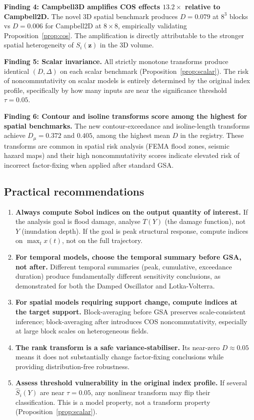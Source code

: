 \documentclass[11pt,onecolumn]{article}
\begin{document}
\textbf{Finding 4: Campbell3D amplifies COS effects $13.2\times$ relative to
Campbell2D.}
The novel 3D spatial benchmark produces $D = 0.079$ at $8^3$ blocks vs
$D = 0.006$ for Campbell2D at $8\times8$, empirically validating
Proposition~\ref{prop:cos}.  The amplification is directly attributable to
the stronger spatial heterogeneity of $S_i(\mathbf{z})$ in the 3D volume.

\textbf{Finding 5: Scalar invariance.}
All strictly monotone transforms produce identical $(D, \Delta)$ on each scalar
benchmark (Proposition~\ref{prop:scalar}).  The risk of noncommutativity on scalar
models is entirely determined by the original index profile, specifically by how
many inputs are near the significance threshold $\tau = 0.05$.

\textbf{Finding 6: Contour and isoline transforms score among the highest for
spatial benchmarks.}
The new contour-exceedance and isoline-length transforms achieve
$D_\mu = 0.372$ and $0.405$, among the highest mean $D$ in the registry.
These transforms are common in spatial risk analysis (FEMA flood zones,
seismic hazard maps) and their high noncommutativity scores indicate elevated
risk of incorrect factor-fixing when applied after standard GSA.

\subsection{Practical recommendations}
\label{sec:recommendations}

\begin{enumerate}
  \item \textbf{Always compute Sobol indices on the output quantity of interest.}
    If the analysis goal is flood damage, analyse $T(Y)$ (the damage function),
    not $Y$ (inundation depth). If the goal is peak structural response, compute
    indices on $\max_t x(t)$, not on the full trajectory.
  \item \textbf{For temporal models, choose the temporal summary before GSA, not after.}
    Different temporal summaries (peak, cumulative, exceedance duration) produce
    fundamentally different sensitivity conclusions, as demonstrated for both
    the Damped Oscillator and Lotka-Volterra.
  \item \textbf{For spatial models requiring support change, compute indices at
    the target support.}  Block-averaging before GSA preserves scale-consistent
    inference; block-averaging after introduces COS noncommutativity, especially
    at large block scales on heterogeneous fields.
  \item \textbf{The rank transform is a safe variance-stabiliser.}
    Its near-zero $D \approx 0.05$ means it does not substantially change
    factor-fixing conclusions while providing distribution-free robustness.
  \item \textbf{Assess threshold vulnerability in the original index profile.}
    If several $\hat{S}_i(Y)$ are near $\tau = 0.05$, any nonlinear transform
    may flip their classification. This is a model property, not a transform
    property (Proposition~\ref{prop:scalar}).
\end{enumerate}
\end{document}
